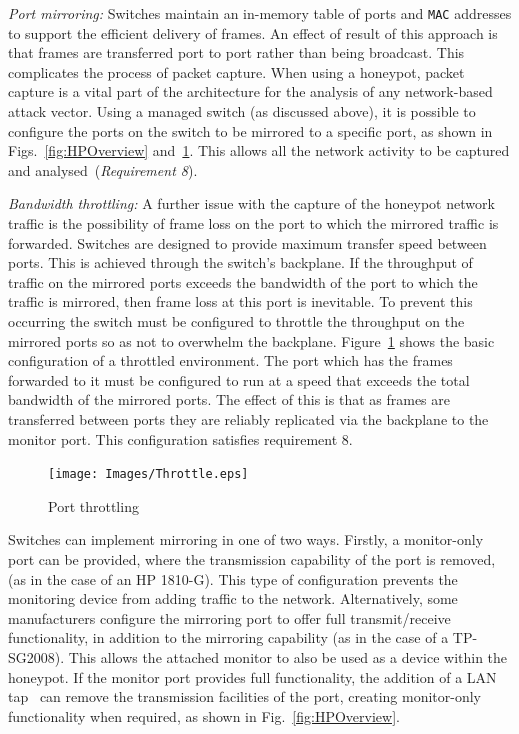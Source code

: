 \documentclass[10pt,journal]{IEEEtran}
\begin{document}
\noindent\emph{Port mirroring:}
Switches maintain an in-memory table of ports and \texttt{MAC} addresses to
support the efficient delivery of frames. An effect of result of this approach
is that frames are transferred port to port rather than being broadcast. This
complicates the process of packet capture. When using a honeypot, packet
capture is a vital part of the architecture for the analysis of any
network-based attack vector. Using a managed switch (as discussed above), it is
possible to configure the ports on the switch to be mirrored to a specific
port, as shown in Figs.~\ref{fig:HPOverview} and~\ref{fig:throttling}. This
allows all the network activity to be captured and analysed~(\emph{Requirement
8}).

\noindent\emph{Bandwidth throttling:}
A further issue with the capture of the honeypot network traffic is the
possibility of frame loss on the port to which the mirrored traffic is
forwarded.  Switches are designed to provide maximum transfer speed between
ports. This is achieved through the switch's backplane. If the throughput of
traffic on the mirrored ports exceeds the bandwidth of the port to which the
traffic is mirrored, then frame loss at this port is inevitable. To prevent
this occurring the switch must be configured to throttle the throughput on the
mirrored ports so as not to overwhelm the backplane.
Figure~\ref{fig:throttling} shows the basic configuration of a throttled
environment. The port which has the frames forwarded to it must be configured
to run at a speed that exceeds the total bandwidth of the mirrored ports. The
effect of this is that as frames are transferred between ports they are
reliably replicated via the backplane to the monitor port. This configuration
satisfies requirement 8.

\begin{figure}[h]
\begin{center}
	\texttt{[image: Images/Throttle.eps]}
\caption{Port throttling\label{fig:throttling}}
\end{center}
\end{figure}

Switches can implement mirroring in one of two ways. Firstly, a monitor-only
port can be provided, where the transmission capability of the port is removed,
(as in the case of an HP 1810-G). This type of configuration prevents the
monitoring device from adding traffic to the network. Alternatively, some
manufacturers configure the mirroring port to offer full transmit/receive
functionality, in addition to the mirroring capability (as in the case of a
TP-SG2008). This allows the attached monitor to also be used as a device within
the honeypot. If the monitor port provides full functionality, the addition of
a LAN tap~\cite{RB:13} can remove the transmission facilities of the port,
creating monitor-only functionality when required, as shown in
Fig.~\ref{fig:HPOverview}.
\end{document}
